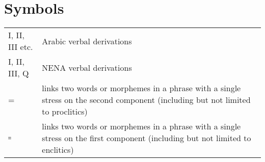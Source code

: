 \documentclass[output=paper]{langsci/langscibook}
\begin{document}
\section*{Symbols}

\begin{tabularx}{1\textwidth}{@{}lQ@{}}
I, II, III etc. & Arabic verbal derivations\\
I, II, III, Q & NENA verbal derivations\\
= & links two words or morphemes in a phrase with a single stress on the second component (including but not limited to proclitics)\\
꞊ & links two words or morphemes in a phrase with a single stress on the first component (including but not limited to enclitics)
\end{tabularx}%

{\sloppy\printbibliography[heading=subbibliography,notkeyword=this]}
\end{document}
